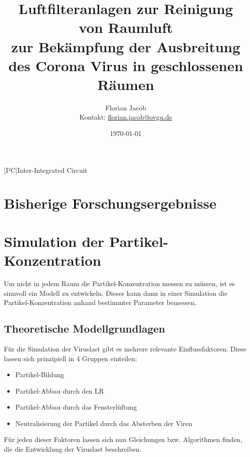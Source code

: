 \documentclass[12pt,a4paper,bibtotocnumbered,liststotocnumbered]{scrreprt}
\title{\textbf{Luftfilteranlagen zur Reinigung von Raumluft}\\zur Bekämpfung der Ausbreitung des Corona Virus in geschlossenen Räumen}
\author{Florian Jacob \\Kontakt: \url{florian.jacob@ovgu.de}}
\date{\today}
\begin{document}
\maketitle

\begin{acronym}[Bash]
 [I²C]{Inter-Integrated Circuit}
\end{acronym}



\tableofcontents
\newpage
{}
\plain



\chapter{Bisherige Forschungsergebnisse}

\chapter{Simulation der Partikel-Konzentration}
Um nicht in jedem Raum die Partikel-Konzentration messen zu müssen, ist es sinnvoll ein Modell zu entwickeln. Dieses kann dann in einer Simulation die Partikel-Konzentration anhand bestimmter Parameter bemessen.

\section{Theoretische Modellgrundlagen}
Für die Simulation der Viruslast gibt es mehrere relevante Einflussfaktoren. Diese lassen sich prinzipiell in 4 Gruppen einteilen:
\begin{itemize}
\item Partikel-Bildung
\item Partikel-Abbau durch den \ac{LR}
\item Partikel-Abbau durch das Fensterlüftung
\item Neutralisierung der Partikel durch das Absterben der Viren
\end{itemize}
Für jeden dieser Faktoren lassen sich nun Gleichungen bzw. Algorithmen finden, die die Entwicklung der Viruslast beschreiben.
\end{document}
